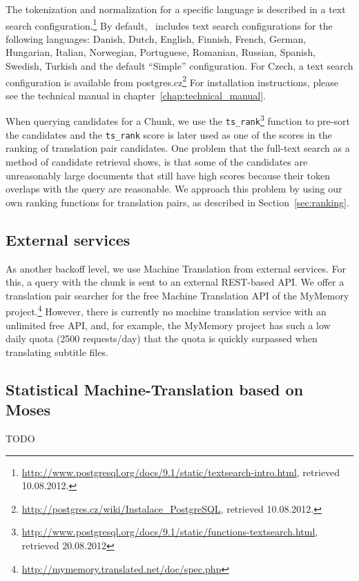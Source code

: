 The tokenization and normalization for a specific language is described in a text search configuration.\footnote{\url{http://www.postgresql.org/docs/9.1/static/textsearch-intro.html}, retrieved 10.08.2012.} By default, \postgres~includes text search configurations for the following languages: Danish, Dutch, English, Finnish, French, German, Hungarian, Italian, Norwegian, Portuguese, Romanian, Russian, Spanish, Swedish, Turkish and the default ``Simple'' configuration. For Czech, a text search configuration is available from postgres.cz\footnote{\url{http://postgres.cz/wiki/Instalace_PostgreSQL}, retrieved 10.08.2012.} For installation instructions, please see the technical manual in chapter~\ref{chap:technical_manual}.

When querying candidates for a Chunk, we use the {\tt ts\_rank}\footnote{\url{http://www.postgresql.org/docs/9.1/static/functions-textsearch.html}, retrieved 20.08.2012} function to pre-sort the candidates and the {\tt ts\_rank} score is later used as one of the scores in the ranking of translation pair candidates. One problem that the full-text search as a method of candidate retrieval shows, is that some of the candidates are unreasonably large documents that still have high scores because their token overlaps with the query are reasonable. We approach this problem by using our own ranking functions for translation pairs, as described in Section~\ref{sec:ranking}.


\subsection{External services}

As another backoff level, we use Machine Translation from external services.
For this, a query with the chunk is sent to an external REST-based API. We offer a translation pair searcher for the free Machine Translation API of the MyMemory project.\footnote{ \url{http://mymemory.translated.net/doc/spec.php}} However, there is currently no machine translation service with an unlimited free API, and, for example, the MyMemory project has such a low daily quota (2500 requests/day) that the quota is quickly surpassed when translating subtitle files.

\subsection{Statistical Machine-Translation based on Moses}

TODO



